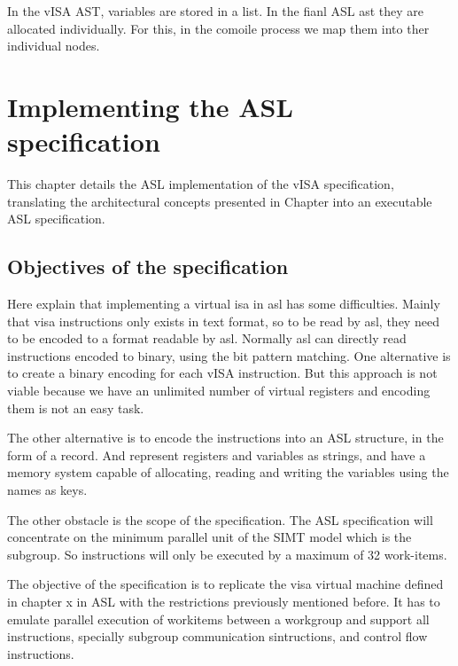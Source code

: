 In the vISA AST, variables are stored in a list. In the fianl ASL ast they are
allocated individually. For this, in the comoile process we map them into ther
individual nodes.


\section{}


\chapter{Implementing the ASL specification}

This chapter details the ASL implementation of the vISA specification,
translating the architectural concepts presented in Chapter into an executable
ASL specification.

\section{Objectives of the specification}
Here explain that implementing a virtual isa in asl has some difficulties.
Mainly that visa instructions only exists in text format, so to be read by asl,
they need to be encoded to a format readable by asl. Normally asl can directly
read instructions encoded to binary, using the bit pattern matching. One
alternative is to create a binary encoding for each vISA instruction. But this
approach is not viable because we have an unlimited number of virtual registers
and encoding them is not an easy task.

The other alternative is to encode the instructions into an ASL structure, in
the form of a record. And represent registers and variables as strings, and
have a memory system capable of allocating, reading and writing the variables
using the names as keys.

The other obstacle is the scope of the specification. The ASL specification
will concentrate on the minimum parallel unit of the SIMT model which is the
subgroup. So instructions will only be executed by a maximum of 32 work-items.

The objective of the specification is to replicate the visa virtual machine
defined in chapter x in ASL with the restrictions previously mentioned before.
It has to emulate parallel execution of workitems between a workgroup and
support all instructions, specially subgroup communication sintructions, and
control flow instructions.



